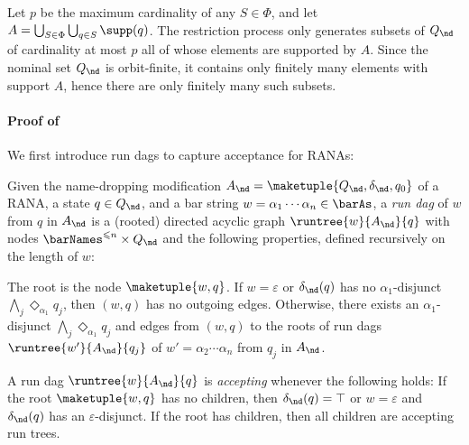 \documentclass[10pt, final, conference, a4paper, twocolumn]{IEEEtran}
\begin{document}
\begin{IEEEproof}
Let $p$ be the maximum cardinality of any $S\in \Phi$, and let $A=\bigcup_{S\in \Phi}\bigcup_{q\in S} \supp(q)$. The restriction process only generates subsets of $Q_{\nd}$ of cardinality at most $p$ all of whose elements are supported by $A$. Since the nominal set $Q_{\nd}$ is orbit-finite, it contains only finitely many elements with support $A$, hence there are only finitely many such subsets.  
\end{IEEEproof}

\paragraph*{Proof of~} We first introduce run dags to capture acceptance for RANAs:

\begin{defn}
  Given the name-dropping modification $A_{\nd} = \maketuple{Q_{\nd}, \delta_{\nd}, q_0}$ of a RANA,
  a state $q \in Q_{\nd}$, and a bar string $w = \alpha_1 \cdots \alpha_n \in \barAs$, a
  \emph{run dag} of $w$ from $q$ in $A_{\nd}$ is a (rooted) directed acyclic graph $\runtree{w}{A_{\nd}}{q}$ with nodes  $\barNames^{\leqslant n} \times Q_{\nd}$ and the following properties,
  defined recursively on the length of $w$:
 
The root is the node
  $\maketuple{w, q}$. If $w = \varepsilon$
  or $\delta_{\nd}(q)$ has no $\alpha_1$-disjunct $\bigwedge_{j} \Diamond_{\alpha_1} q_j$,
  then $(w,q)$ has no outgoing edges.
  Otherwise, there exists an
  $\alpha_1$-disjunct $\bigwedge_{j} \Diamond_{\alpha_1} q_j$ and edges from $(w,q)$ to the roots of run dags $\runtree{w'}{A_{\nd}}{q_j}$ of $w' = \alpha_2 \cdots \alpha_n$ from $q_j$ in $A_{\nd}$.%

A run dag $\runtree{w}{A_{\nd}}{q}$ is \emph{accepting} whenever the following holds: If the root $\maketuple{w, q}$ has no children, then $\delta_{\nd}(q)=\top$ or
  $w = \varepsilon$ and $\delta_{\nd}(q)$ has an $\varepsilon$-disjunct. If the root has children, then all children are accepting run trees.
\end{defn}
\end{document}
